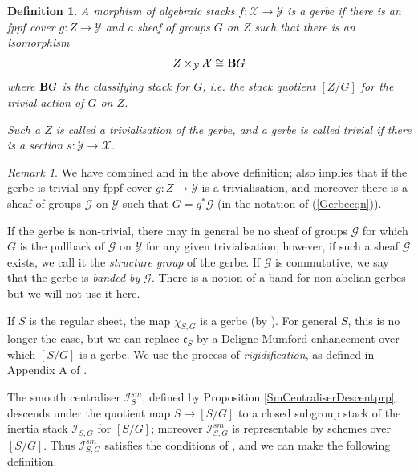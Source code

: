 \documentclass{amsart}
\newtheorem{definition}[theorem]{Definition}
\theoremstyle{remark}
\newtheorem{remark}[theorem]{Remark}
\numberwithin{theorem}{section}
\numberwithin{equation}{section}
\begin{document}
\begin{definition}\cite[Section 2]{Giraud}\label{Gerbedef}
    A morphism of algebraic stacks $f: \mathcal X \rightarrow \mathcal Y$ is a \emph{gerbe} if there is an fppf cover $g:Z \rightarrow \mathcal Y$ and a sheaf of groups $G$ on $Z$ such that there is an isomorphism
    \begin{equation}\label{Gerbeeqn}
        Z \times_\mathcal Y \mathcal X \cong {\bf B}G
    \end{equation}
    where ${\bf B}G$ is the classifying stack for $G$, i.e. the stack quotient $[Z/G]$ for the trivial action of $G$ on $Z$.

    Such a $Z$ is called a \emph{trivialisation} of the gerbe, and a gerbe is called \emph{trivial} if there is a section $s:\mathcal Y\rightarrow \mathcal X$.
\end{definition}

\begin{remark}\label{Gerbermk}
    We have combined \cite[Définition 2.1.1]{Giraud} and \cite[Corollaire 2.2.6]{Giraud} in the above definition; \cite[Corollaire 2.2.6]{Giraud} also implies that if the gerbe is trivial any fppf cover $g:Z\rightarrow \mathcal Y$ is a trivialisation, and moreover there is a sheaf of groups $\mathcal G$ on $\mathcal Y$ such that $G = g^*\mathcal G$ (in the notation of (\ref{Gerbeeqn})).

    If the gerbe is non-trivial, there may in general be no sheaf of groups $\mathcal G$ for which $G$ is the pullback of $\mathcal G$ on $\mathcal Y$ for any given trivialisation; however, if such a sheaf $\mathcal G$ exists, we call it the \emph{structure group} of the gerbe. If $\mathcal G$ is commutative, we say that the gerbe is \emph{banded by $\mathcal G$}. There is a notion of a band for non-abelian gerbes but we will not use it here.
\end{remark}

If $S$ is the regular sheet, the map $\chi_{S,G}$ is a gerbe (by \cite[Proposition 3.5]{Ngo1}). For general $S$, this is no longer the case, but we can replace $\mathfrak{c}_S$ by a Deligne-Mumford enhancement over which $[S/G]$ is a gerbe. We use the process of \emph{rigidification}, as defined in Appendix A of \cite{AOV}.

The smooth centraliser $\mathcal I^{sm}_S$, defined by Proposition \ref{SmCentraliserDescentprp}, descends under the quotient map $S \rightarrow [S/G]$ to a closed subgroup stack of the inertia stack $\mathcal I_{S,G}$ for $[S/G]$; moreover $\mathcal I_{S,G}^{sm}$ is representable by schemes over $[S/G]$. Thus $\mathcal I_{S,G}^{sm}$ satisfies the conditions of  \cite[Theorem A.1]{AOV}, and we can make the following definition.
\end{document}
